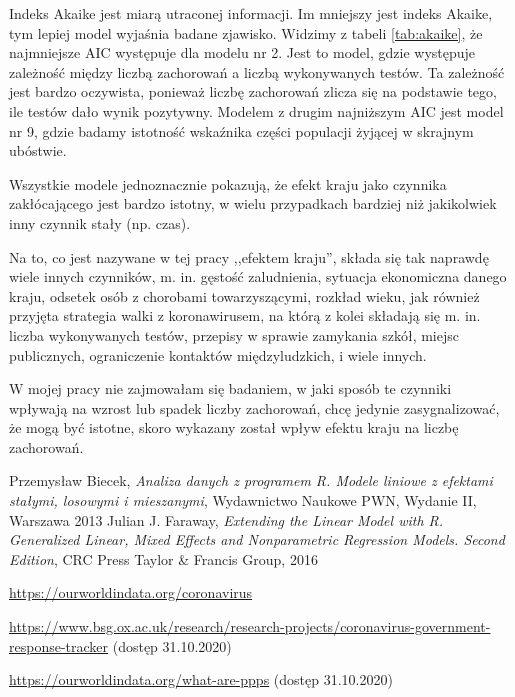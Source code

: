 \documentclass[12pt]{mwbk}
\theoremstyle{plain}
\theoremstyle{definition}
\theoremstyle{remark}
\begin{document}
Indeks Akaike jest miarą utraconej informacji. Im mniejszy jest indeks Akaike, tym lepiej model wyjaśnia badane zjawisko. Widzimy z tabeli \ref{tab:akaike}, że najmniejsze AIC występuje dla modelu nr 2. Jest to model, gdzie występuje zależność między liczbą zachorowań a liczbą wykonywanych testów. Ta zależność jest bardzo oczywista, ponieważ liczbę zachorowań zlicza się na podstawie tego, ile testów dało wynik pozytywny. Modelem z drugim najniższym AIC jest model nr 9, gdzie badamy istotność wskaźnika części populacji żyjącej w skrajnym ubóstwie.



Wszystkie modele jednoznacznie pokazują, że efekt kraju jako czynnika zakłócającego jest bardzo istotny, w wielu przypadkach bardziej niż jakikolwiek inny czynnik stały (np. czas).

Na to, co jest nazywane w tej pracy ,,efektem kraju'', składa się tak naprawdę wiele innych czynników, m. in. gęstość zaludnienia, sytuacja ekonomiczna danego kraju, odsetek osób z chorobami towarzyszącymi, rozkład wieku, jak również przyjęta strategia walki z koronawirusem, na którą z kolei składają się m. in. liczba wykonywanych testów, przepisy w sprawie zamykania szkół, miejsc publicznych, ograniczenie kontaktów międzyludzkich, i wiele innych.

W mojej pracy nie zajmowałam się badaniem, w jaki sposób te czynniki wpływają na wzrost lub spadek liczby zachorowań, chcę jedynie zasygnalizować, że mogą być istotne, skoro wykazany został wpływ efektu kraju na liczbę zachorowań.

\begin{thebibliography}{99}

 Przemysław Biecek, \emph{Analiza danych z programem R. Modele liniowe z efektami stałymi, losowymi i mieszanymi}, Wydawnictwo Naukowe PWN, Wydanie II, Warszawa 2013
 Julian J. Faraway, \emph{Extending the Linear Model with R. Generalized Linear, Mixed Effects and Nonparametric Regression Models. Second Edition}, CRC Press Taylor \& Francis  Group, 2016

 \url{https://ourworldindata.org/coronavirus}

 \url{https://www.bsg.ox.ac.uk/research/research-projects/coronavirus-government-response-tracker} (dostęp 31.10.2020)

 \url{https://ourworldindata.org/what-are-ppps} (dostęp 31.10.2020)

\end{thebibliography}
\end{document}
